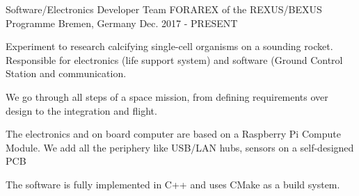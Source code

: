 

\begin{cventries}

  \cventry
    {Software/Electronics Developer} %
    {Team FORAREX of the REXUS/BEXUS Programme} %
    {Bremen, Germany} %
    {Dec. 2017 - PRESENT} %
    {
      \begin{cvitems} %
        \item {Experiment to research calcifying single-cell organisms on a sounding rocket. Responsible for electronics (life support system) and software (Ground Control Station and communication.}
        \item {We go through all steps of a space mission, from defining requirements over design to the integration and flight.}
        \item {The electronics and on board computer are based on a Raspberry Pi Compute Module. We add all the periphery like USB/LAN hubs, sensors on a self-designed PCB}
        \item {The software is fully implemented in C++ and uses CMake as a build system.}
      \end{cvitems}
    }

\end{cventries}
